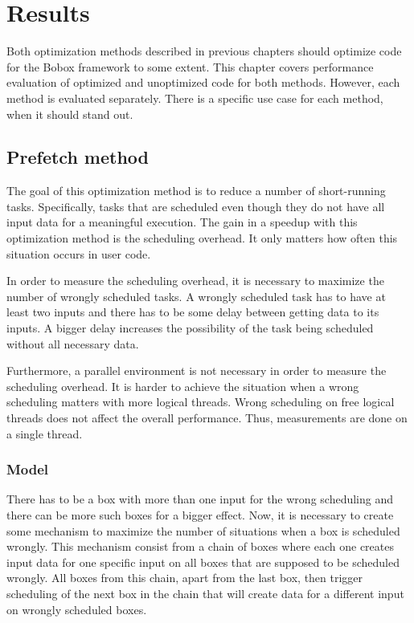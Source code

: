 \chapter{Results}
\label{results}
Both optimization methods described in previous chapters should optimize code for the Bobox framework to some extent. This chapter covers performance evaluation of optimized and unoptimized code for both methods. However, each method is evaluated separately. There is a specific use case for each method, when it should stand out.

\section{Prefetch method}
\label{results-prefetch}
The goal of this optimization method is to reduce a number of short-running tasks. Specifically, tasks that are scheduled even though they do not have all input data for a meaningful execution. The gain in a speedup with this optimization method is the scheduling overhead. It only matters how often this situation occurs in user code.

In order to measure the scheduling overhead, it is necessary to maximize the number of wrongly scheduled tasks. A wrongly scheduled task has to have at least two inputs and there has to be some delay between getting data to its inputs. A bigger delay increases the possibility of the task being scheduled without all necessary data.

Furthermore, a parallel environment is not necessary in order to measure the scheduling overhead. It is harder to achieve the situation when a wrong scheduling matters with more logical threads. Wrong scheduling on free logical threads does not affect the overall performance. Thus, measurements are done on a single thread.

\subsection{Model}
There has to be a box with more than one input for the wrong scheduling and there can be more such boxes for a bigger effect. Now, it is necessary to create some mechanism to maximize the number of situations when a box is scheduled wrongly. This mechanism consist from a chain of boxes where each one creates input data for one specific input on all boxes that are supposed to be scheduled wrongly. All boxes from this chain, apart from the last box, then trigger scheduling of the next box in the chain that will create data for a different input on wrongly scheduled boxes.

